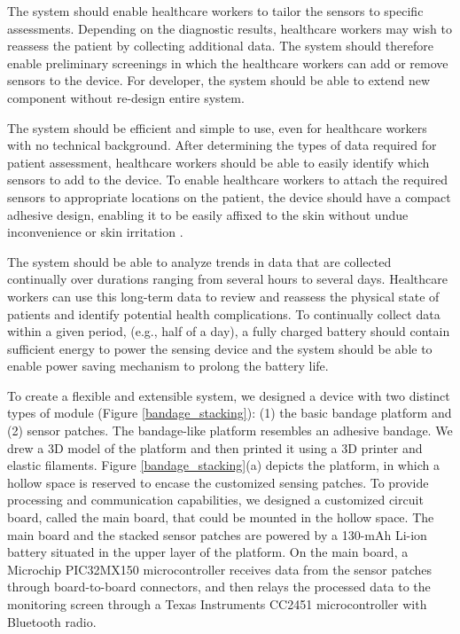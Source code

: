 The system should enable healthcare workers to tailor the sensors to specific assessments. Depending on the diagnostic results, healthcare workers may wish to reassess the patient by collecting additional data. The system should therefore enable preliminary screenings in which the healthcare workers can add or remove sensors to the device. For developer, the system should be able to extend new component without re-design entire system.

The system should be efficient and simple to use, even for healthcare workers with no technical background. After determining the types of data required for patient assessment, healthcare workers should be able to easily identify which sensors to add to the device. To enable healthcare workers to attach the required sensors to appropriate locations on the patient, the device should have a compact adhesive design, enabling it to be easily affixed to the skin without undue inconvenience or skin irritation \cite{Barrett2014}. 

The system should be able to analyze trends in data that are collected continually over durations ranging from several hours to several days. Healthcare workers can use this long-term data to review and reassess the physical state of patients and identify potential health complications. To continually collect data within a given period, (e.g., half of a day), a fully charged battery should contain sufficient energy to power the sensing device and the system should be able to enable power saving mechanism to prolong the battery life.

To create a flexible and extensible system, we designed a device with two distinct types of module (Figure \ref{bandage_stacking}): (1) the basic bandage platform and (2) sensor patches. The bandage-like platform resembles an adhesive bandage. We drew a 3D model of the platform and then printed it using a 3D printer and elastic filaments. Figure \ref{bandage_stacking}(a) depicts the platform, in which a hollow space is reserved to encase the customized sensing patches. To provide processing and communication capabilities, we designed a customized circuit board, called the main board, that could be mounted in the hollow space. The main board and the stacked sensor patches are powered by a 130-mAh Li-ion battery situated in the upper layer of the platform. On the main board, a Microchip PIC32MX150 microcontroller receives data from the sensor patches through board-to-board connectors, and then relays the processed data to the monitoring screen through a Texas Instruments CC2451 microcontroller with Bluetooth radio. 

